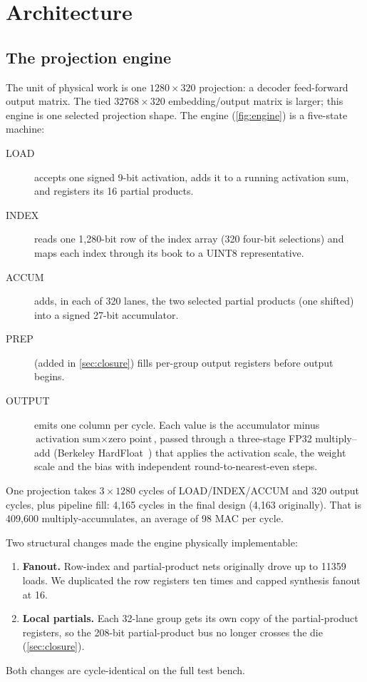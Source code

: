\section{Architecture}
\label{sec:architecture}

\subsection{The projection engine}
The unit of physical work is one $1280\times320$ projection: a decoder feed-forward output matrix. The tied $32768\times320$ embedding/output matrix is larger; this engine is one selected projection shape. 
The engine (\cref{fig:engine}) is a five-state machine:
\begin{description}
\item[LOAD] accepts one signed 9-bit activation, adds it to a running activation sum, and registers its 16 partial products.
\item[INDEX] reads one 1,280-bit row of the index array (320 four-bit selections) and maps each index through its book to a UINT8 representative.
\item[ACCUM] adds, in each of 320 lanes, the two selected partial products (one shifted) into a signed 27-bit accumulator.
\item[PREP] (added in \cref{sec:closure}) fills per-group output registers before output begins.
\item[OUTPUT] emits one column per cycle. Each value is the accumulator minus $\text{activation sum}\times\text{zero point}$, passed through a three-stage FP32 multiply--add (Berkeley HardFloat~\cite{hauser_hardfloat}) that applies the activation scale, the weight scale and the bias with independent round-to-nearest-even steps.
\end{description}
One projection takes $3\times1280$ cycles of LOAD/INDEX/ACCUM and 320 output cycles, plus pipeline fill: 4,165 cycles in the final design (4,163 originally). That is 409,600 multiply-accumulates, an average of 98 MAC per cycle.

Two structural changes made the engine physically implementable:
\begin{enumerate}
\item \textbf{Fanout.} Row-index and partial-product nets originally drove up to \num{11359} loads. We duplicated the row registers ten times and capped synthesis fanout at 16.
\item \textbf{Local partials.} Each 32-lane group gets its own copy of the partial-product registers, so the 208-bit partial-product bus no longer crosses the die (\cref{sec:closure}).
\end{enumerate}
Both changes are cycle-identical on the full test bench.

